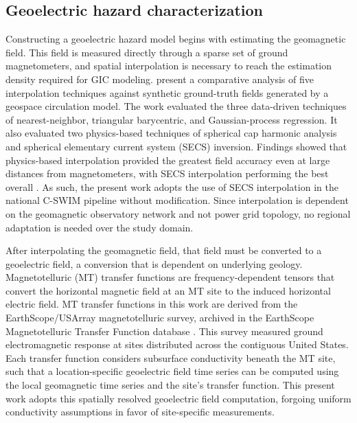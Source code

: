 \documentclass[draft]{agujournal2019}
\begin{document}
\subsection{Geoelectric hazard characterization}

Constructing a geoelectric hazard model begins with estimating the geomagnetic field. This field is measured directly through a sparse set of ground magnetometers, and spatial interpolation is necessary to reach the estimation density required for GIC modeling.  present a comparative analysis of five interpolation techniques against synthetic ground-truth fields generated by a geospace circulation model. The work evaluated the three data-driven techniques of nearest-neighbor, triangular barycentric, and Gaussian-process regression. It also evaluated two physics-based techniques of spherical cap harmonic analysis and spherical elementary current system (SECS) inversion. Findings showed that physics-based interpolation provided the greatest field accuracy even at large distances from magnetometers, with SECS interpolation performing the best overall \cite{Rigler2019}. As such, the present work adopts the use of SECS interpolation in the national C-SWIM pipeline without modification. Since interpolation is dependent on the geomagnetic observatory network and not power grid topology, no regional adaptation is needed over the study domain. 

After interpolating the geomagnetic field, that field must be converted to a geoelectric field, a conversion that is dependent on underlying geology. Magnetotelluric (MT) transfer functions are frequency-dependent tensors that convert the horizontal magnetic field at an MT site to the induced horizontal electric field. MT transfer functions in this work are derived from the EarthScope/USArray magnetotelluric survey, archived in the EarthScope Magnetotelluric Transfer Function database \cite{Kelbert2011, Kelbert2017}. This survey measured ground electromagnetic response at sites distributed across the contiguous United States. Each transfer function considers subsurface conductivity beneath the MT site, such that a location-specific geoelectric field time series can be computed using the local geomagnetic time series and the site's transfer function. This present work adopts this spatially resolved geoelectric field computation, forgoing uniform conductivity assumptions in favor of site-specific measurements. 
\end{document}
